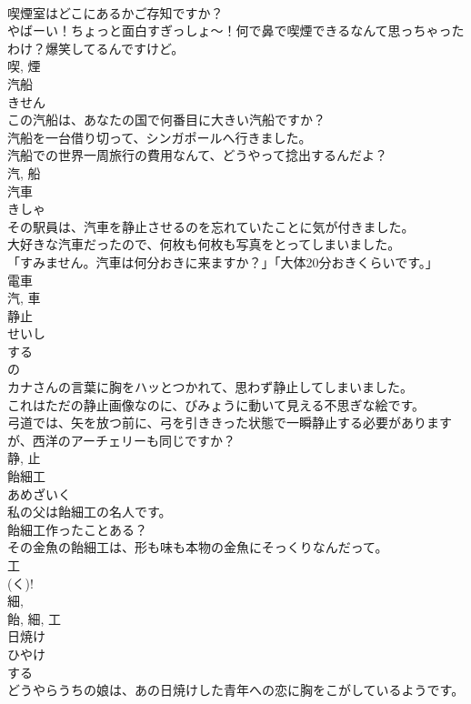 \documentclass[8pt]{extreport}
\begin{document}
\begin{CJK}{UTF8}{min}
\\	喫煙室はどこにあるかご存知ですか？	
\\	やばーい！ちょっと面白すぎっしょ〜！何で鼻で喫煙できるなんて思っちゃったわけ？爆笑してるんですけど。	
\\	喫, 煙	
\\	汽船	
\\	きせん	
\\	この汽船は、あなたの国で何番目に大きい汽船ですか？	
\\	汽船を一台借り切って、シンガポールへ行きました。	
\\	汽船での世界一周旅行の費用なんて、どうやって捻出するんだよ？	
\\	汽, 船	
\\	汽車	
\\	きしゃ	
\\	その駅員は、汽車を静止させるのを忘れていたことに気が付きました。	
\\	大好きな汽車だったので、何枚も何枚も写真をとってしまいました。	
\\	「すみません。汽車は何分おきに来ますか？」「大体20分おきくらいです。」	
\\	電車
\\	汽, 車	
\\	静止	
\\	せいし	
\\	する 
\\	の 
\\	カナさんの言葉に胸をハッとつかれて、思わず静止してしまいました。	
\\	これはただの静止画像なのに、びみょうに動いて見える不思ぎな絵です。	
\\	弓道では、矢を放つ前に、弓を引ききった状態で一瞬静止する必要がありますが、西洋のアーチェリーも同じですか？	
\\	静, 止	
\\	飴細工	
\\	あめざいく	
\\	私の父は飴細工の名人です。	
\\	飴細工作ったことある？	
\\	その金魚の飴細工は、形も味も本物の金魚にそっくりなんだって。	
\\	工 
\\	(く)! 
\\	細, 
\\	飴, 細, 工	
\\	日焼け	
\\	ひやけ	
\\	する 
\\	どうやらうちの娘は、あの日焼けした青年への恋に胸をこがしているようです。	

\end{CJK}
\end{document}
